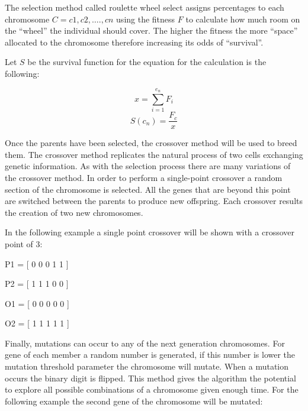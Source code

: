 \documentclass{AISB2008}
\begin{document}
The selection method called roulette wheel select assigns percentages to each chromosome {$C = {c1,c2,….,cn}$} using the fitness {$F$} to calculate how much room on the “wheel” the individual should cover. The higher the fitness the more “space” allocated to the chromosome therefore increasing its odds of “survival”.

Let {$S$} be the survival function for the equation for the calculation is the following:

\begin{equation}
x = \sum\limits_{i=1}^{e_n} {F_i} 
\end{equation}
\begin{equation}
S(c_n) = \frac {F_c }{x}
\end{equation}

Once the parents have been selected, the crossover method will be used to breed them. The crossover method replicates the natural process of two cells exchanging genetic information. As with the selection process there are many variations of the crossover method. In order to perform a single-point crossover a random section of the chromosome is selected. All the genes that are beyond this point are switched between the parents to produce new offspring. Each crossover results the creation of two new chromosomes.

In the following example a single point crossover will be shown with a crossover point of 3:

\begin{center}
P1 = [ 0 0 0 {\color{red} 1 1}  ]
\end{center}
\begin{center}
P2 = [ 1 1 1 {\color{green} 0 0}  ]
\end{center}
\begin{center}
O1 = [ 0 0 0 {\color{green} 0 0}  ]
\end{center}
\begin{center}
O2 = [ 1 1 1 {\color{red} 1 1}  ]
\end{center}

Finally, mutations can occur to any of the next generation chromosomes. For gene of each member a random number is generated, if this number is lower the mutation threshold parameter the chromosome will mutate. When a mutation occurs the binary digit is flipped. This method gives the algorithm the potential to explore all possible combinations of a chromosome given enough time.
For the following example the second gene of the chromosome will be mutated:
\end{document}
